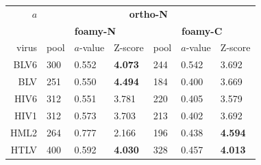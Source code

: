 \documentclass[12pt]{article}
\newcommand{\3}{$3_{10}$}
\begin{document}
\begin{table}
\centering
\begin{tabular}{r|lll|lll|}
$a$  & \multicolumn{6}{c|}{\bf ortho-N} \\
     & \multicolumn{3}{c|}{\bf foamy-N} & \multicolumn{3}{c|}{\bf foamy-C}  \\
\hline \hline
virus  & pool & $a$-value & Z-score & pool & $a$-value & Z-score \\
\hline
BLV6   &  300  & 0.552 & {\bf 4.073} &  244  & 0.542 &      3.692  \\
BLV    &  251  & 0.550 & {\bf 4.494} &  184  & 0.400 &      3.669  \\
HIV6   &  312  & 0.551 &      3.781  &  220  & 0.405 &      3.579  \\
HIV1   &  312  & 0.573 &      3.703  &  213  & 0.402 &      3.692  \\
HML2   &  264  & 0.777 &      2.166  &  196  & 0.438 & {\bf 4.594} \\
HTLV   &  400  & 0.592 & {\bf 4.030} &  328  & 0.457 & {\bf 4.013} \\

\end{tabular}
\end{table}
\end{document}
